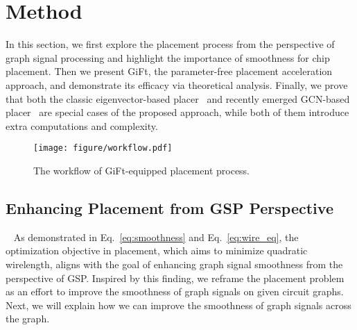 \section{Method} \label{sec:method}
In this section, we first explore the placement process from the perspective of graph signal processing and highlight the importance of smoothness for chip placement.
Then we present GiFt, the parameter-free placement acceleration approach, and demonstrate its efficacy via theoretical analysis. Finally, we prove that both the classic eigenvector-based placer~\cite{eigen_placer, eigen_placer2} and recently emerged GCN-based placer~\cite{graphplanner, CY2021} are special cases of the proposed approach, while both of them introduce extra computations and complexity.


\begin{figure*}[htbp]
\texttt{[image: figure/workflow.pdf]}
\centering  
\vspace{-2.5em}
\caption{The workflow of GiFt-equipped placement process.}\label{fig:workflow}
\vspace{-1.5em}
\end{figure*}

\subsection{Enhancing Placement from GSP Perspective}~\label{sec:method1}
As demonstrated in Eq.~\ref{eq:smoothness} and Eq.~\ref{eq:wire_eq}, the optimization objective in placement, which aims to minimize quadratic wirelength, aligns with the goal of enhancing graph signal smoothness from the perspective of GSP. Inspired by this finding, we reframe the placement problem as an effort to improve the smoothness of graph signals on given circuit graphs.
Next, we will explain how we can improve the smoothness of graph signals across the graph.

